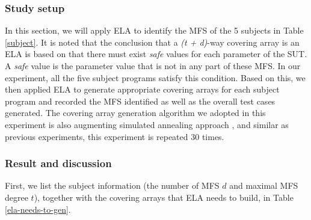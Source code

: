 \documentclass[10pt,journal,compsoc]{IEEEtran}
\begin{document}
{\subsubsection{Study setup}
In this section, we will  apply ELA to identify the MFS of the 5 subjects in Table \ref{subject}. It is noted that the conclusion that a \emph{(t + d)}-way covering array is an ELA
is based on that there must exist \emph{safe} values for each parameter of the SUT. A \emph{safe} value is the parameter value that is not in any part of these MFS. In our experiment, all the five subject programs satisfy this condition. Based on this, we then applied ELA to generate appropriate covering arrays for each subject program and recorded the MFS identified as well as the overall test cases generated. The covering array generation algorithm we adopted in this experiment is also augmenting simulated annealing approach \cite{cohen2003augmenting,cohen2008constructing2}, and similar as previous experiments, this experiment is repeated 30 times.






\subsubsection{Result and discussion}
First, we list the subject information (the number of MFS $d$ and maximal MFS degree $t$), together with the covering arrays that ELA needs to build, in Table \ref{ela-needs-to-gen}.

}
\end{document}
